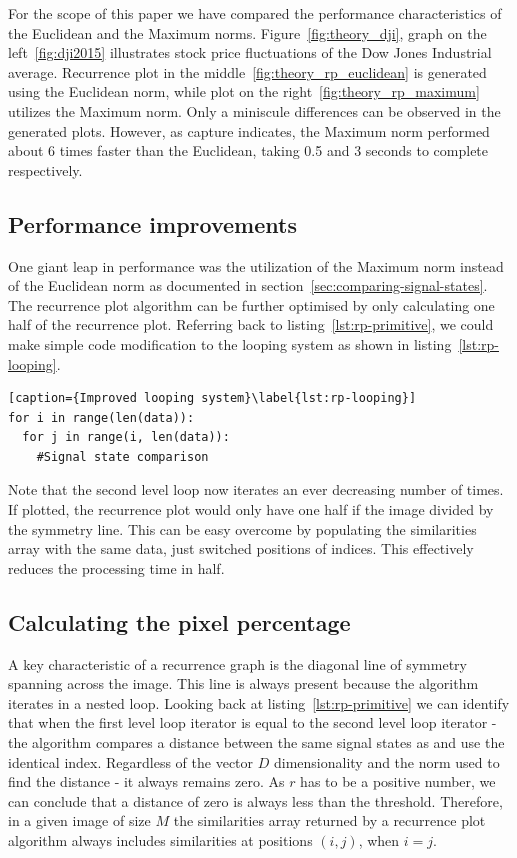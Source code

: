 \documentclass[a4paper,12pt,fleqn]{article}
\begin{document}
For the scope of this paper we have compared the performance characteristics of the Euclidean and the Maximum norms.
Figure~\ref{fig:theory_dji}, graph on the left~\ref{fig:dji2015} illustrates stock price fluctuations of the Dow Jones Industrial average.
Recurrence plot in the middle~\ref{fig:theory_rp_euclidean} is generated using the Euclidean norm, while plot on the right~\ref{fig:theory_rp_maximum} utilizes the Maximum norm.
Only a miniscule differences can be observed in the generated plots.
However, as capture indicates, the Maximum norm performed about 6 times faster than the Euclidean, taking 0.5 and 3 seconds to complete respectively.


\subsection{Performance improvements}
One giant leap in performance was the utilization of the Maximum norm instead of the Euclidean norm as documented in section~\ref{sec:comparing-signal-states}.
The recurrence plot algorithm can be further optimised by only calculating one half of the recurrence plot.
Referring back to listing~\ref{lst:rp-primitive}, we could make simple code modification to the looping system as shown in listing~\ref{lst:rp-looping}.
\begin{lstlisting}[caption={Improved looping system}\label{lst:rp-looping}]
for i in range(len(data)):
  for j in range(i, len(data)):
    #Signal state comparison
\end{lstlisting}
Note that the second level loop now iterates an ever decreasing number of times.
If plotted, the recurrence plot would only have one half if the image divided by the symmetry line.
This can be easy overcome by populating the similarities array with the same data, just switched positions of indices.
This effectively reduces the processing time in half. 


\subsection{Calculating the pixel percentage}
A key characteristic of a recurrence graph is the diagonal line of symmetry spanning across the image.
This line is always present because the algorithm iterates in a nested loop.
Looking back at listing~\ref{lst:rp-primitive} we can identify that when the first level loop iterator  is equal to the second level loop iterator  - the algorithm compares a distance between the same signal states as  and  use the identical index.
Regardless of the vector $D$ dimensionality and the norm used to find the distance - it always remains zero.
As $r$ has to be a positive number, we can conclude that a distance of zero is always less than the threshold.
Therefore, in a given image of size $M$ the similarities array returned by a recurrence plot algorithm always includes similarities at positions $(i, j)$, when $i = j$.
\end{document}
